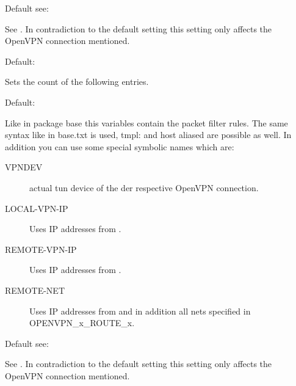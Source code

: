 \begin{description}

  Default see: 

  See
  . 
  In contradiction to the default setting this setting only affects the OpenVPN 
  connection mentioned.


  Default: 

  Sets the count of the following  entries.


  Default: 

  Like in package base this variables contain the packet filter rules. 
  The same syntax like in base.txt is used, tmpl: and host aliased are possible 
  as well. In addition you can use some special symbolic names which are:

\begin{description}

\item [VPNDEV] actual tun device of the der respective OpenVPN connection.

\item [LOCAL-VPN-IP] Uses IP addresses from .

\item [REMOTE-VPN-IP] Uses IP addresses from .

\item [REMOTE-NET] Uses IP addresses from  and 
 in addition all nets specified in OPENVPN\_x\_ROUTE\_x.

\end{description}


  Default see: 

  See
  . 
  In contradiction to the default setting this setting only affects the OpenVPN 
  connection mentioned.


\end{description}
